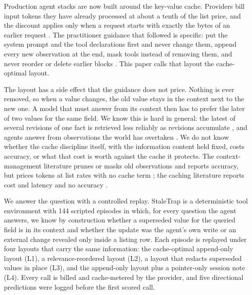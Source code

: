 Production agent stacks are now built around the key-value cache. Providers bill input tokens they have already processed at about a tenth of the list price, and the discount applies only when a request starts with exactly the bytes of an earlier request \citep{a2312_07104,a2601_06007}. The practitioner guidance that followed is specific: put the system prompt and the tool declarations first and never change them, append every new observation at the end, mask tools instead of removing them, and never reorder or delete earlier blocks \citep{manus2025,anthropic2025context}. This paper calls that layout the cache-optimal layout.

The layout has a side effect that the guidance does not price. Nothing is ever removed, so when a value changes, the old value stays in the context next to the new one. A model that must answer from its context then has to prefer the later of two values for the same field. We know this is hard in general: the latest of several revisions of one fact is retrieved less reliably as revisions accumulate \citep{a2603_12271,a2510_22752}, and agents answer from observations the world has overtaken \citep{a2610_05281}. We do not know whether the cache discipline itself, with the information content held fixed, costs accuracy, or what that cost is worth against the cache it protects. The context-management literature prunes or masks old observations and reports accuracy, but prices tokens at list rates with no cache term \citep{a2606_10209,a2508_21433,a2605_18854}; the caching literature reports cost and latency and no accuracy \citep{a2601_06007,a2607_15516}.

We answer the question with a controlled replay. StaleTrap is a deterministic tool environment with 144 scripted episodes in which, for every question the agent answers, we know by construction whether a superseded value for the queried field is in its context and whether the update was the agent's own write or an external change revealed only inside a listing row. Each episode is replayed under four layouts that carry the same information: the cache-optimal append-only layout (L1), a relevance-reordered layout (L2), a layout that redacts superseded values in place (L3), and the append-only layout plus a pointer-only session note (L4). Every call is billed and cache-metered by the provider, and five directional predictions were logged before the first scored call.

